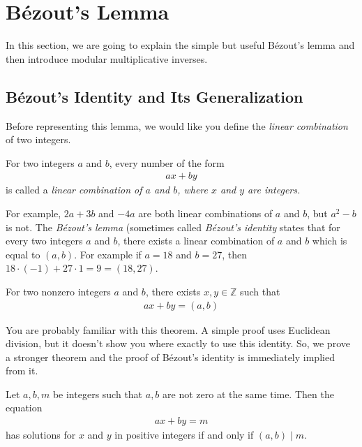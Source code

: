 \documentclass{subfile}
\begin{document}
	\section{B\'{e}zout's Lemma}

	In this section, we are going to explain the simple but useful B\'{e}zout's lemma and then introduce modular multiplicative inverses.

	\subsection{B\'{e}zout's Identity and Its Generalization}
	Before representing this lemma, we would like you define the \textit{linear combination} of two integers.

	\begin{definition}\label{def:linearcombination}
		For two integers $a$ and $b$, every number of the form
		\begin{align*} ax+by\end{align*}
		is called a \itshape{linear combination} of $a$ and $b$, where $x$ and $y$ are integers.
	\end{definition}

	For example, $2a+3b$ and $-4a$ are both linear combinations of $a$ and $b$, but $a^2-b$ is not. The \textit{B\'{e}zout's lemma} (sometimes called \textit{B\'{e}zout's identity} states that for every two integers $a$ and $b$, there exists a linear combination of $a$ and $b$ which is equal to $(a,b)$. For example if $a=18$ and $b=27$, then $18 \cdot (-1) + 27 \cdot 1 = 9 =(18,27)$.

	\begin{theorem} 
		For two nonzero integers $a$ and $b$, there exists $x, y \in \mathbb Z$ such that
		\begin{align*}
		ax+by = (a,b)
		\end{align*}
	\end{theorem}

	You are probably familiar with this theorem. A simple proof uses Euclidean division, but it doesn't show you where exactly to use this identity. So, we prove a stronger theorem and the proof of B\'{e}zout's identity is immediately implied from it.

	\begin{theorem} \label{thm:equationgcd}
		Let $a,b,m$ be integers such that $a, b$ are not zero at the same time. Then the equation
		\begin{align*} ax + by = m\end{align*}
		has solutions for $x$ and $y$ in positive integers if and only if $(a,b)\mid m$.
	\end{theorem}
\end{document}
